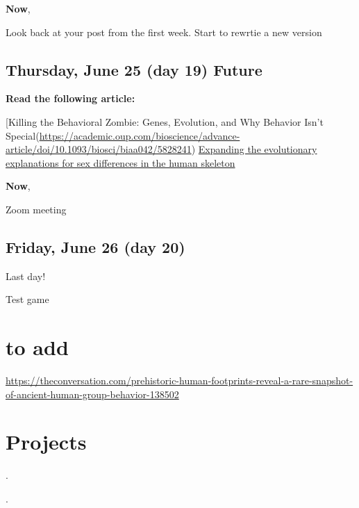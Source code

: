 \documentclass[]{tufte-handout}
\begin{document}
\textbf{Now},

Look back at your post from the first week. Start to rewrtie a new
version

\hypertarget{thursday-june-25-day-19-future}{%
\subsection{Thursday, June 25 (day 19)
Future}\label{thursday-june-25-day-19-future}}

\textbf{Read the following article:}

{[}Killing the Behavioral Zombie: Genes, Evolution, and Why Behavior
Isn't
Special(\url{https://academic.oup.com/bioscience/advance-article/doi/10.1093/biosci/biaa042/5828241})
\href{https://onlinelibrary.wiley.com/doi/epdf/10.1002/evan.21834}{Expanding
the evolutionary explanations for sex differences in the human skeleton}

\textbf{Now},

Zoom meeting

\hypertarget{friday-june-26-day-20}{%
\subsection{Friday, June 26 (day 20)}\label{friday-june-26-day-20}}

Last day!

Test game

\hypertarget{to-add}{%
\section{to add}\label{to-add}}

\url{https://theconversation.com/prehistoric-human-footprints-reveal-a-rare-snapshot-of-ancient-human-group-behavior-138502}

\hypertarget{projects}{%
\section{Projects}\label{projects}}

.

.
\end{document}
